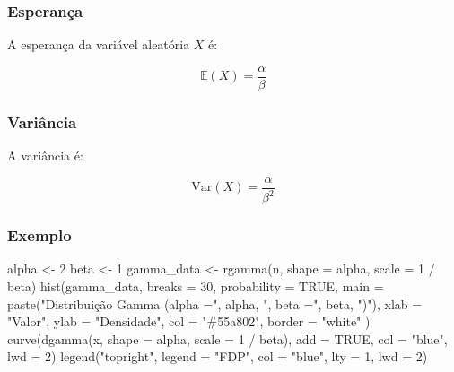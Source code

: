 \documentclass[
]{article}
\newenvironment{Shaded}{\begin{snugshade}}{\end{snugshade}}
\newcommand{\AttributeTok}[1]{\textcolor[rgb]{0.77,0.63,0.00}{#1}}
\newcommand{\ConstantTok}[1]{\textcolor[rgb]{0.00,0.00,0.00}{#1}}
\newcommand{\DecValTok}[1]{\textcolor[rgb]{0.00,0.00,0.81}{#1}}
\newcommand{\FunctionTok}[1]{\textcolor[rgb]{0.00,0.00,0.00}{#1}}
\newcommand{\NormalTok}[1]{#1}
\newcommand{\OtherTok}[1]{\textcolor[rgb]{0.56,0.35,0.01}{#1}}
\newcommand{\SpecialCharTok}[1]{\textcolor[rgb]{0.00,0.00,0.00}{#1}}
\newcommand{\StringTok}[1]{\textcolor[rgb]{0.31,0.60,0.02}{#1}}
\begin{document}
\hypertarget{esperanuxe7a-7}{%
\subsubsection{Esperança}\label{esperanuxe7a-7}}

A esperança da variável aleatória \(X\) é:

\[
\mathbb{E}(X) = \frac{\alpha}{\beta}
\]

\hypertarget{variuxe2ncia-7}{%
\subsubsection{Variância}\label{variuxe2ncia-7}}

A variância é:

\[
\text{Var}(X) = \frac{\alpha}{\beta^2}
\]

\hypertarget{exemplo-gamma}{%
\subsubsection{Exemplo}\label{exemplo-gamma}}

\begin{Shaded}
\begin{Highlighting}[]
\NormalTok{alpha }\OtherTok{\textless{}{-}} \DecValTok{2}
\NormalTok{beta }\OtherTok{\textless{}{-}} \DecValTok{1}
\NormalTok{gamma\_data }\OtherTok{\textless{}{-}} \FunctionTok{rgamma}\NormalTok{(n, }\AttributeTok{shape =}\NormalTok{ alpha, }\AttributeTok{scale =} \DecValTok{1} \SpecialCharTok{/}\NormalTok{ beta)}
\FunctionTok{hist}\NormalTok{(gamma\_data,}
  \AttributeTok{breaks =} \DecValTok{30}\NormalTok{, }\AttributeTok{probability =} \ConstantTok{TRUE}\NormalTok{,}
  \AttributeTok{main =} \FunctionTok{paste}\NormalTok{(}\StringTok{"Distribuição Gamma (alpha ="}\NormalTok{, alpha, }\StringTok{", beta ="}\NormalTok{, beta, }\StringTok{")"}\NormalTok{),}
  \AttributeTok{xlab =} \StringTok{"Valor"}\NormalTok{, }\AttributeTok{ylab =} \StringTok{"Densidade"}\NormalTok{,}
  \AttributeTok{col =} \StringTok{"\#55a802"}\NormalTok{, }\AttributeTok{border =} \StringTok{"white"}
\NormalTok{)}
\FunctionTok{curve}\NormalTok{(}\FunctionTok{dgamma}\NormalTok{(x, }\AttributeTok{shape =}\NormalTok{ alpha, }\AttributeTok{scale =} \DecValTok{1} \SpecialCharTok{/}\NormalTok{ beta), }\AttributeTok{add =} \ConstantTok{TRUE}\NormalTok{, }\AttributeTok{col =} \StringTok{"blue"}\NormalTok{, }\AttributeTok{lwd =} \DecValTok{2}\NormalTok{)}
\FunctionTok{legend}\NormalTok{(}\StringTok{"topright"}\NormalTok{, }\AttributeTok{legend =} \StringTok{"FDP"}\NormalTok{, }\AttributeTok{col =} \StringTok{"blue"}\NormalTok{, }\AttributeTok{lty =} \DecValTok{1}\NormalTok{, }\AttributeTok{lwd =} \DecValTok{2}\NormalTok{)}
\end{Highlighting}
\end{Shaded}
\end{document}

